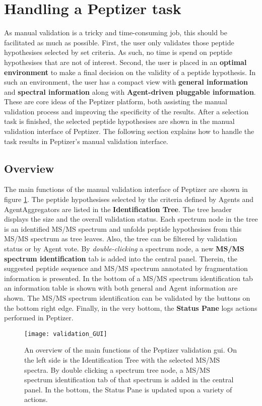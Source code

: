 %
\section{Handling a Peptizer task}
\npar As manual validation is a tricky and time-consuming job, this should be facilitated as much as possible. First, the user only validates those peptide hypothesises selected by set criteria. As such, no time is spend on peptide hypothesises that are not of interest. Second, the user is placed in an \textbf{optimal environment} to make a final decision on the validity of a peptide hypothesis. In such an environment, the user has a compact view with \textbf{general information }and \textbf{spectral information }along with \textbf{Agent-driven pluggable information}. These are core ideas of the Peptizer platform, both assisting the manual validation process and improving the specificity of the results.
\npar After a selection task is finished, the selected peptide hypothesises are shown in the manual validation interface of Peptizer. The following section explains how to handle the task results in Peptizer's manual validation interface.

\subsection{Overview}
\npar The main functions of the manual validation interface of Peptizer are shown in figure \ref{validation_GUI}.
\npar The peptide hypothesises selected by the criteria defined by Agents and AgentAggregators are listed in the \textbf{Identification Tree}. The tree header displays the size and the overall validation status. Each spectrum node in the tree is an identified MS/MS spectrum and unfolds peptide hypothesises from this MS/MS spectrum as tree leaves. Also, the tree can be filtered by validation status or by Agent vote.
\npar By \textit{double-clicking} a spectrum node, a new \textbf{MS/MS spectrum identification} tab is added into the central panel. Therein, the suggested peptide sequence and MS/MS spectrum annotated by fragmentation information is presented. In the bottom of a MS/MS spectrum identification tab an information table is shown with both general and Agent information are shown. The MS/MS spectrum identification can be validated by the buttons on the bottom right edge.
\npar Finally, in the very bottom, the \textbf{Status Pane} logs actions performed in Peptizer.
\begin{figure}
\begin{center}
	\texttt{[image: validation\_GUI]}
	\caption{\label{validation_GUI}An overview of the main functions of the Peptizer validation gui. On the left side is the Identification Tree with the selected MS/MS spectra. By double clicking a spectrum tree node, a MS/MS spectrum identification tab of that spectrum is added in the central panel. In the bottom, the Status Pane is updated upon a variety of actions.}
\end{center}
\end{figure}
%
\pagebreak
